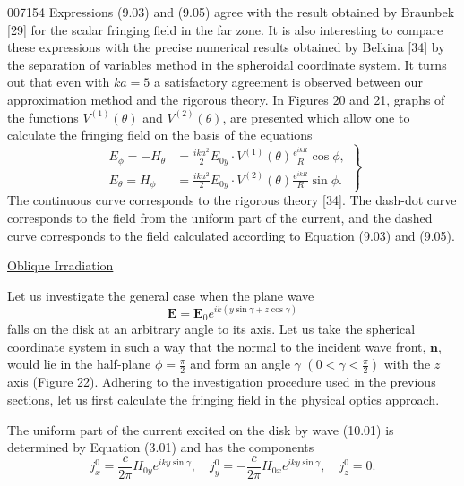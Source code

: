 \begin{scanpage}{0071}{54}
Expressions (9.03) and (9.05) agree with the result obtained by Braunbek [29] for the scalar fringing field in the far zone. It is also interesting to compare these expressions with the precise numerical results obtained by Belkina [34] by the separation of variables method in the spheroidal coordinate system. It turns out that even with $ka=5$ a satisfactory agreement is observed between our approximation method and the rigorous theory. In Figures 20 and 21, graphs of the functions $V^{(1)}(\theta)$ and $V^{(2)}(\theta)$, are presented which allow one to calculate the fringing field on the basis of the equations
\[\left.\begin{aligned}E_\phi=-H_\theta&=\frac{ika^2}2E_{0y}\cdot V^{(1)}(\theta)\frac{e^{ikR}}R\cos\phi,\\E_\theta=H_\phi&=\frac{ika^2}2E_{0y}\cdot V^{(2)}(\theta)\frac{e^{ikR}}R\sin\phi.\end{aligned}\right\}\tag{9.07}\]
The continuous curve corresponds to the rigorous theory [34]. The dash-dot curve corresponds to the field from the uniform part of the current, and the dashed curve corresponds to the field calculated according to Equation (9.03) and (9.05).
\begin{center}\underline{Oblique Irradiation}\end{center}
Let us investigate the general case when the plane wave
\[\mathbf E=\mathbf E_0e^{ik(y\sin\gamma+z\cos\gamma)}\tag{10.01}\]
falls on the disk at an arbitrary angle to its axis. Let us take the spherical coordinate system in such a way that the normal to the incident wave front, $\mathbf n$, would lie in the half-plane $\phi=\frac\pi2$ and form an angle $\gamma$ $\left(0<\gamma<\frac\pi2\right)$ with the $z$ axis (Figure 22). Adhering to the investigation procedure used in the previous sections, let us first calculate the fringing field in the physical optics approach.

The uniform part of the current excited on the disk by wave (10.01) is determined by Equation (3.01) and has the components
\[j_x^0=\frac c{2\pi}H_{0y}e^{iky\sin\gamma},\quad j_y^0=-\frac c{2\pi}H_{0x}e^{iky\sin\gamma},\quad j_z^0=0.\tag{10.02}\]
\end{scanpage}
